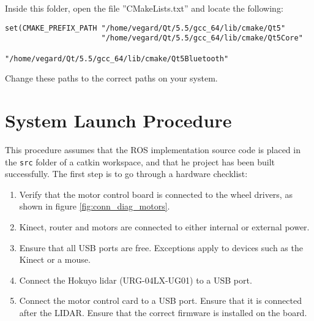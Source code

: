 Inside this folder, open the file ''CMakeLists.txt'' and locate the following:

\begin{verbatim}
set(CMAKE_PREFIX_PATH "/home/vegard/Qt/5.5/gcc_64/lib/cmake/Qt5"
					  "/home/vegard/Qt/5.5/gcc_64/lib/cmake/Qt5Core"
					  "/home/vegard/Qt/5.5/gcc_64/lib/cmake/Qt5Bluetooth"
\end{verbatim}

Change these paths to the correct paths on your system.




\section{System Launch Procedure}

This procedure assumes that the \ac{ROS} implementation source code is placed in the \texttt{src} folder of a catkin workspace, and that he project has been built successfully. The first step is to go through a hardware checklist:

\begin{enumerate}
	\item Verify that the motor control board is connected to the wheel drivers, as shown in figure \ref{fig:conn_diag_motors}.
	\item Kinect, router and motors are connected to either internal or external power.
	\item Ensure that all USB ports are free. Exceptions apply to devices such as the Kinect or a mouse. 
	\item Connect the Hokuyo lidar (URG-04LX-UG01) to a USB port.
	\item Connect the motor control card to a USB port. Ensure that it is connected after the LIDAR. Ensure that the correct firmware is installed on the board.
\end{enumerate}

